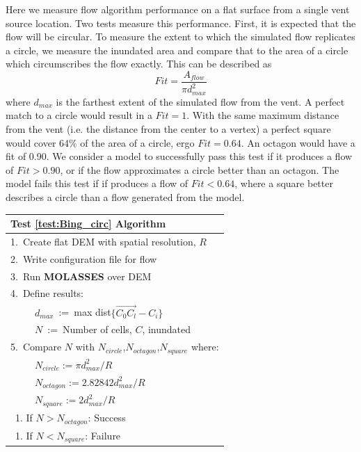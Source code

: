 \documentclass[12pt,letter]{article}
\newcommand{\tabitem}{~~\llap{\textbullet}~~}
\newcommand{\tabitem}{~~\llap{\textbullet}~~}
\begin{document}
			Here we measure flow algorithm performance on a flat surface from a single vent source location. Two tests measure this performance. First, it is expected that the flow will be circular. To measure the extent to which the simulated flow replicates a circle, we measure the inundated area and compare that to the area of a circle which circumscribes the flow exactly. This can be described as
			\begin{equation}
				Fit = \frac{A_{flow}}{\pi d_{max}^2}
			\end{equation}
			where $d_{max}$ is the farthest extent of the simulated flow from the vent. A perfect match to a circle would result in a $Fit=1$. With the same maximum distance from the vent (i.e. the distance from the center to a vertex) a perfect square would cover 64\% of the area of a circle, ergo $Fit=0.64$. An octagon would have a fit of 0.90. We consider a model to successfully pass this test if it produces a flow of $Fit>0.90$, or if the flow approximates a circle better than an octagon. The model fails this test if if produces a flow of $Fit<0.64$, where a square better describes a circle than a flow generated from the model.

			\begin{center}
				\begin{tabular}{l}
					\toprule
					\textbf{Test \ref{test:Bing_circ} Algorithm}\\
					\midrule
					1.~Create flat DEM with spatial resolution, $R$\\
					2.~Write configuration file for flow\\
					3.~Run \textbf{MOLASSES} over DEM\\
					4.~Define results:\\
						~\tabitem $d_{max}$~:=~max dist$\{\overrightarrow{C_0C_l}-C_i\}$\\
						~\tabitem $N$~:=~Number of cells, $C$, inundated\\
					5.~Compare $N$ with $N_{circle}$,$N_{octagon}$,$N_{square}$ where:\\
						~\tabitem $N_{circle}:=\pi d_{max}^2/R$\\
						~\tabitem $N_{octagon}:=2.82842 d_{max}^2/R$\\
						~\tabitem $N_{square}:=2d_{max}^2/R$\\
						~1. If $N>N_{octagon}$: Success\\
						~1. If $N<N_{square}$: Failure\\
					\bottomrule
				\end{tabular}
			\end{center}
\end{document}

